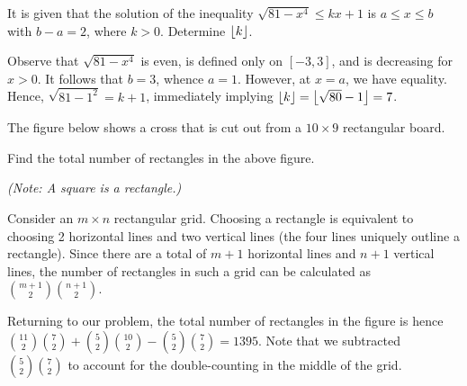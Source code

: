 \clearpage
\begin{question}[7]\label{A::2021-O-1-4}
    It is given that the solution of the inequality $\sqrt{81 - x^4} \leq kx + 1$ is $a \leq x \leq b$ with $b - a = 2$, where $k > 0$. Determine $\left\lfloor k \right\rfloor$.
\end{question}
\begin{solution*}
    Observe that $\sqrt{81 - x^4}$ is even, is defined only on $[-3, 3]$, and is decreasing for $x > 0$. It follows that $b = 3$, whence $a = 1$. However, at $x = a$, we have equality. Hence, $\sqrt{81 - 1^2} = k + 1$, immediately implying $\left\lfloor k \right\rfloor = \left\lfloor \sqrt{80} - 1 \right\rfloor = 7$.
\end{solution*}

\begin{question}[1395]\label{A::2021-O-1-5}
    The figure below shows a cross that is cut out from a $10 \times 9$ rectangular board.

    \begin{center}
    \end{center} Find the total number of rectangles in the above figure.

    \noindent\textit{(Note: A square is a rectangle.)}
\end{question}
\begin{solution*}
    Consider an $m \times n$ rectangular grid. Choosing a rectangle is equivalent to choosing 2 horizontal lines and two vertical lines (the four lines uniquely outline a rectangle). Since there are a total of $m+1$ horizontal lines and $n+1$ vertical lines, the number of rectangles in such a grid can be calculated as $\binom{m+1}{2} \binom{n+1}{2}$.

    Returning to our problem, the total number of rectangles in the figure is hence $\binom{11}{2} \binom{7}{2} + \binom{5}{2} \binom{10}{2} - \binom{5}{2} \binom{7}{2} = 1395$. Note that we subtracted $\binom{5}{2} \binom{7}{2}$ to account for the double-counting in the middle of the grid.
\end{solution*}

